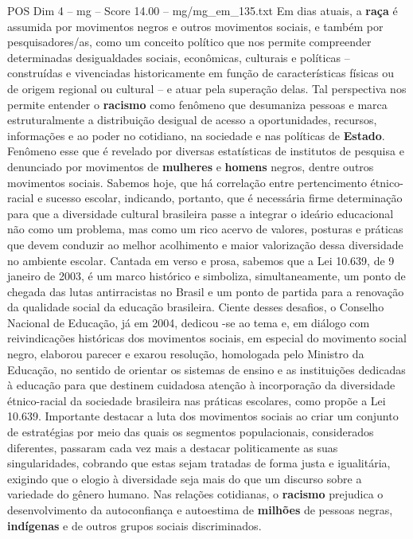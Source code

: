 \begin{textsample}{POS Dim 4 – mg – Score 14.00 – mg/mg\_em\_135.txt}
Em dias atuais, a \textbf{raça} é assumida por movimentos negros e outros movimentos sociais, e também por pesquisadores/as, como um conceito político que nos permite compreender determinadas desigualdades sociais, econômicas, culturais e políticas – construídas e vivenciadas historicamente em função de características físicas ou de origem regional ou cultural – e atuar pela superação delas.
Tal perspectiva nos permite entender o \textbf{racismo} como fenômeno que desumaniza pessoas e marca estruturalmente a distribuição desigual de acesso a oportunidades, recursos, informações e ao poder no cotidiano, na sociedade e nas políticas de \textbf{Estado}.
Fenômeno esse que é revelado por diversas estatísticas de institutos de pesquisa e denunciado por movimentos de \textbf{mulheres} e \textbf{homens} negros, dentre outros movimentos sociais.
Sabemos hoje, que há correlação entre pertencimento étnico-racial e sucesso escolar, indicando, portanto, que é necessária firme determinação para que a diversidade cultural brasileira passe a integrar o ideário educacional não como um problema, mas como um rico acervo de valores, posturas e práticas que devem conduzir ao melhor acolhimento e maior valorização dessa diversidade no ambiente escolar.
Cantada em verso e prosa, sabemos que a Lei 10.639, de 9 janeiro de 2003, é um marco histórico e simboliza, simultaneamente, um ponto de chegada das lutas antirracistas no Brasil e um ponto de partida para a renovação da qualidade social da educação brasileira.
Ciente desses desafios, o Conselho Nacional de Educação, já em 2004, dedicou -se ao tema e, em diálogo com reivindicações históricas dos movimentos sociais, em especial do movimento social negro, elaborou parecer e exarou resolução, homologada pelo Ministro da Educação, no sentido de orientar os sistemas de ensino e as instituições dedicadas à educação para que destinem cuidadosa atenção à incorporação da diversidade étnico-racial da sociedade brasileira nas práticas escolares, como propõe a Lei 10.639.
Importante destacar a luta dos movimentos sociais ao criar um conjunto de estratégias por meio das quais os segmentos populacionais, considerados diferentes, passaram cada vez mais a destacar politicamente as suas singularidades, cobrando que estas sejam tratadas de forma justa e igualitária, exigindo que o elogio à diversidade seja mais do que um discurso sobre a variedade do gênero humano.
Nas relações cotidianas, o \textbf{racismo} prejudica o desenvolvimento da autoconfiança e autoestima de \textbf{milhões} de pessoas negras, \textbf{indígenas} e de outros grupos sociais discriminados.

\end{textsample}
